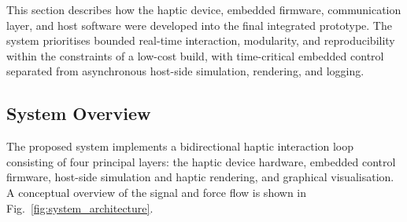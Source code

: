 This section describes how the haptic device, embedded firmware, communication layer, and host software were developed into the final integrated prototype. The system prioritises bounded real-time interaction, modularity, and reproducibility within the constraints of a low-cost build, with time-critical embedded control separated from asynchronous host-side simulation, rendering, and logging.

\subsection{System Overview}

The proposed system implements a bidirectional haptic interaction loop consisting of four principal layers: the haptic device hardware, embedded control firmware, host-side simulation and haptic rendering, and graphical visualisation. A conceptual overview of the signal and force flow is shown in Fig.~\ref{fig:system_architecture}.

